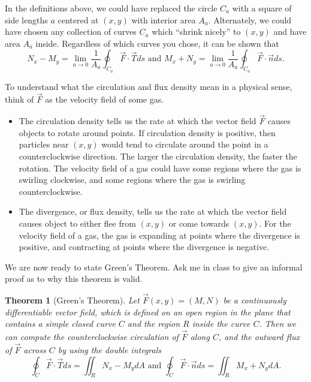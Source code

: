 \documentclass[10pt,]{book}
\theoremstyle{plain}
\newtheorem{theorem}{Theorem}[section]
\theoremstyle{definition}
\theoremstyle{definition}
\theoremstyle{definition}
\theoremstyle{definition}
\theoremstyle{definition}
\numberwithin{equation}{section}
\begin{document}
In the definitions above, we could have replaced the circle \(C_a\) with a square of side lengths \(a\) centered at \((x,y)\) with interior area \(A_a\). Alternately, we could have chosen any collection of curves \(C_a\) which ``shrink nicely'' to \((x,y)\) and have area \(A_a\) inside. Regardless of which curves you chose, it can be shown that%
\begin{equation*}
N_x-M_y=\lim_{a\to 0} \frac{1}{A_a}\oint_{C_a} \vec F \cdot \vec T ds  \text{ and }   M_x+N_y=\lim_{a\to 0} \frac{1}{A_a}\oint_{C_a} \vec F \cdot \vec n ds.
\end{equation*}
%
\par
To understand what the circulation and flux density mean in a physical sense, think of \(\vec F\) as the velocity field of some gas. \leavevmode%
\begin{itemize}[label=\textbullet]
\item{}The circulation density tells us the rate at which the vector field \(\vec F\) causes objects to rotate around points.  If circulation density is positive, then particles near \((x,y)\) would tend to circulate around the point in a counterclockwise direction. The larger the circulation density, the faster the rotation. The velocity field of a gas could have some regions where the gas is swirling clockwise, and some regions where the gas is swirling counterclockwise.%
\item{}The divergence, or flux density, tells us the rate at which the vector field causes object to either flee from \((x,y)\) or come towards \((x,y)\). For the velocity field of a gas, the gas is expanding at points where the divergence is positive, and contracting at points where the divergence is negative.%
\end{itemize}
%
\par
We are now ready to state Green's Theorem. Ask me in class to give an informal proof as to why this theorem is valid.%
\begin{theorem}[{Green's Theorem}]\label{theorem-12}
Let \(\vec F(x,y)=(M,N)\) be a continuously differentiable vector field, which is defined on an open region in the plane that contains a simple closed curve \(C\) and the region \(R\) inside the curve \(C\). Then we can compute the counterclockwise circulation of \(\vec F\) along \(C\), and the outward flux of \(\vec F\) across \(C\) by using the double integrals%
\begin{equation*}
\oint_{C} \vec F \cdot \vec T ds=\iint_R N_x-M_y dA 
\text{ and }   
\oint_{C} \vec F \cdot \vec n ds=\iint_R M_x+N_y dA.
\end{equation*}
%
\end{theorem}
\end{document}
